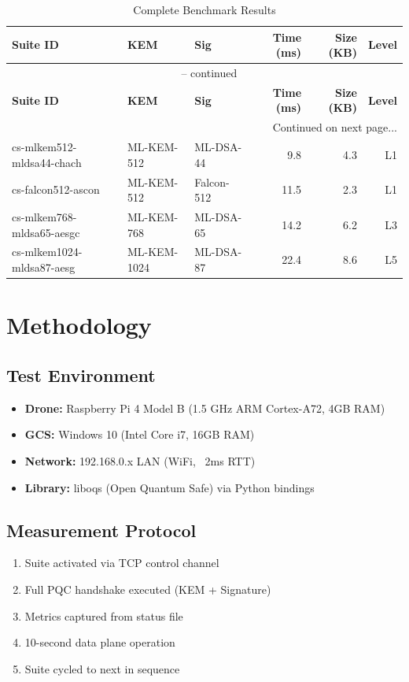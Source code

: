 \documentclass[11pt,a4paper,twoside]{article}
\begin{document}
\begin{longtable}{l l l r r r}
\caption{Complete Benchmark Results} \\
\toprule
\textbf{Suite ID} & \textbf{KEM} & \textbf{Sig} & \textbf{Time (ms)} & \textbf{Size (KB)} & \textbf{Level} \\
\midrule
\endfirsthead
\multicolumn{6}{c}{\tablename\ \thetable{} -- continued} \\
\toprule
\textbf{Suite ID} & \textbf{KEM} & \textbf{Sig} & \textbf{Time (ms)} & \textbf{Size (KB)} & \textbf{Level} \\
\midrule
\endhead
\midrule
\multicolumn{6}{r}{Continued on next page...} \\
\endfoot
\bottomrule
\endlastfoot
cs-mlkem512-mldsa44-chach & ML-KEM-512 & ML-DSA-44 & 9.8 & 4.3 & L1 \\
cs-falcon512-ascon & ML-KEM-512 & Falcon-512 & 11.5 & 2.3 & L1 \\
cs-mlkem768-mldsa65-aesgc & ML-KEM-768 & ML-DSA-65 & 14.2 & 6.2 & L3 \\
cs-mlkem1024-mldsa87-aesg & ML-KEM-1024 & ML-DSA-87 & 22.4 & 8.6 & L5 \\

\end{longtable}

\section{Methodology}

\subsection{Test Environment}
\begin{itemize}
    \item \textbf{Drone:} Raspberry Pi 4 Model B (1.5 GHz ARM Cortex-A72, 4GB RAM)
    \item \textbf{GCS:} Windows 10 (Intel Core i7, 16GB RAM)
    \item \textbf{Network:} 192.168.0.x LAN (WiFi, ~2ms RTT)
    \item \textbf{Library:} liboqs (Open Quantum Safe) via Python bindings
\end{itemize}

\subsection{Measurement Protocol}
\begin{enumerate}
    \item Suite activated via TCP control channel
    \item Full PQC handshake executed (KEM + Signature)
    \item Metrics captured from status file
    \item 10-second data plane operation
    \item Suite cycled to next in sequence
\end{enumerate}
\end{document}
